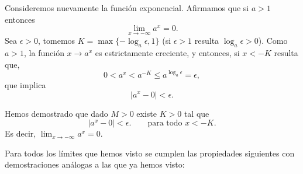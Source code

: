 \begin{example}
    Consideremos nuevamente la función exponencial. Afirmamos que si $a>1$ entonces
    \[
    \lim_{x\to-\infty} a^x = 0.
    \]
    Sea $\epsilon>0$, tomemos $K=\max\{-\log_a \epsilon, 1\}$ (si $\epsilon>1$ resulta $\log_a \epsilon>0$). Como $a>1$, la función $x\to a^x$ es estrictamente creciente, y entonces, si $x<-K$ resulta que,
    \[
    0< a^x < a^{-K} \le a^{\log_a \epsilon} = \epsilon,
    \]
    que implica
    \[
    |a^x-0| < \epsilon.
    \]
    
    Hemos demostrado que dado $M>0$ existe $K>0$ tal que 
    \[
    |a^x-0| < \epsilon.
        \qquad\text{para todo $x<-K$}.
    \]
    Es decir, $\lim_{x\to-\infty} a^x = 0$.
\end{example}

Para todos los límites que hemos visto se cumplen las propiedades siguientes con demostraciones análogas a las que ya hemos visto:


